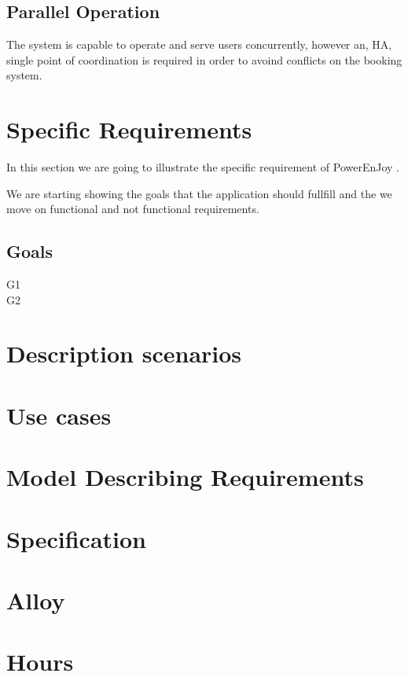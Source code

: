\documentclass[11pt]{article} %
\newcommand{\pe}{PowerEnJoy }
\begin{document}
  \subsection{Parallel Operation}
  The system is capable to operate and serve users concurrently, however an, HA, single point of coordination is required in order to avoind conflicts on the booking system.

\section{Specific Requirements}

In this section we are going to illustrate the specific requirement of \pe.

We are starting showing the goals that the application should fullfill and the we move on functional and not functional requirements.

  \subsection{Goals}
  
  \begin{description}
    \item[G1]
    \item[G2]
  \end{description}


\section{Description scenarios}

\section{Use cases}

\section{Model Describing Requirements}

\section{Specification}

\section{Alloy}

\section{Hours}
\end{document}
